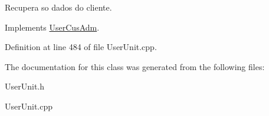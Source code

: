 Recupera so dados do cliente. 



Implements \hyperlink{classUserCusAdm_a8a67bf25c965e931be912f33449e0f8a}{User\-Cus\-Adm}.



Definition at line 484 of file User\-Unit.\-cpp.



The documentation for this class was generated from the following files\-:\begin{DoxyCompactItemize}
\item 
User\-Unit.\-h\item 
User\-Unit.\-cpp\end{DoxyCompactItemize}
